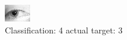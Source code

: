 \begin{figure}[h!]
\begin{center}
\includegraphics[width=0.60\columnwidth]{figures/ID1332_class_4_target_3.png}
\end{center}
\caption{ Classification: 4 actual target: 3}
\label{fig:ID1332_class_4_target_3}
\end{figure}
